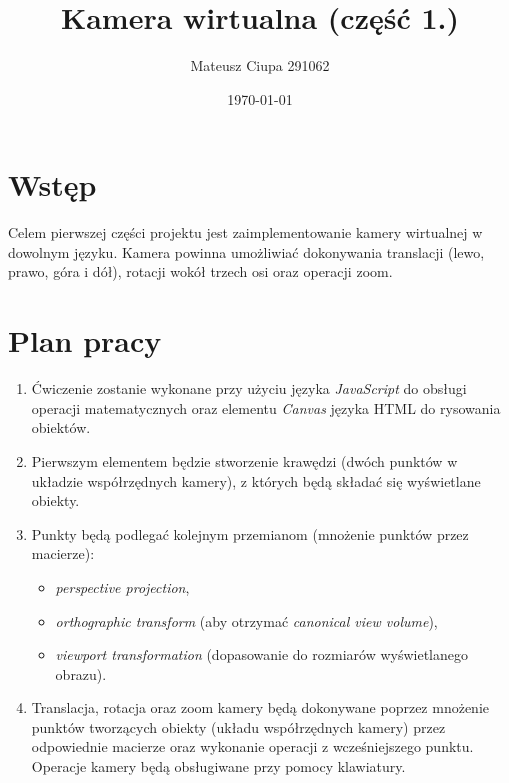 \documentclass{article}
\title{Kamera wirtualna (część 1.)}
\author{Mateusz Ciupa 291062}
\date{\today}
\begin{document}
\maketitle

\section{Wstęp}
Celem pierwszej części projektu jest zaimplementowanie kamery wirtualnej w dowolnym języku.
Kamera powinna umożliwiać dokonywania translacji (lewo, prawo, góra i dół), rotacji wokół
trzech osi oraz operacji zoom.

\section{Plan pracy}

\begin{enumerate}
    \item Ćwiczenie zostanie wykonane przy użyciu języka \textit{JavaScript} do obsługi 
    operacji matematycznych oraz elementu \textit{Canvas} języka HTML do rysowania obiektów.
    \item Pierwszym elementem będzie stworzenie krawędzi (dwóch punktów w układzie
    współrzędnych kamery), z których będą składać się wyświetlane obiekty.
    \item Punkty będą podlegać kolejnym przemianom (mnożenie punktów przez macierze):
    \begin{itemize}
        \item \textit{perspective projection},
        \item \textit{orthographic transform} (aby otrzymać \textit{canonical view volume}),
        \item \textit{viewport transformation} (dopasowanie do rozmiarów wyświetlanego obrazu).
    \end{itemize}
    \item Translacja, rotacja oraz zoom kamery będą dokonywane poprzez mnożenie punktów 
    tworzących obiekty (układu współrzędnych kamery) przez odpowiednie macierze oraz wykonanie
    operacji z wcześniejszego punktu. Operacje kamery będą obsługiwane przy pomocy klawiatury.
\end{enumerate}
 
\end{document}
